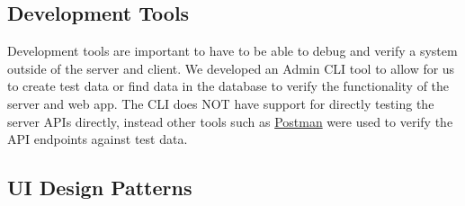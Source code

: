 \documentclass{article}
\begin{document}
\subsection{Development Tools}

Development tools are important to have to be able to debug and verify a system outside of the server and client.  We developed an Admin CLI tool to allow for us to create test data or find data in the database to verify the functionality of the server and web app.
The CLI does NOT have support for directly testing the server APIs directly, instead other tools such as \href{https://www.postman.com}{Postman} were used to verify the API endpoints against test data.

\subsection{UI Design Patterns}
\end{document}
